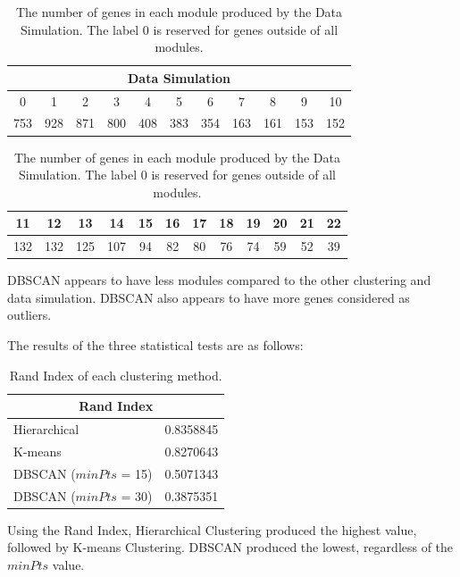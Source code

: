 \documentclass[sigconf,authordraft]{acmart}
\begin{document}
\begin{table}[H]
\begin{center}
\begin{tabular}{|c|c|c|c|c|c|c|c|c|c|c|}
\hline
\multicolumn{11}{|c|}{Data Simulation} \tabularnewline
\hline
0 & 1 & 2 & 3 & 4 & 5 & 6 & 7 & 8 & 9 & 10\\
\hline
753 & 928 & 871 & 800 & 408 & 383 & 354 & 163 & 161 & 153 & 152\\
\hline
\end{tabular}
\end{center}

\begin{center}
\begin{tabular}{|c|c|c|c|c|c|c|c|c|c|c|c|}
\hline
11 & 12 & 13 & 14 & 15 & 16 & 17 & 18 & 19 & 20 & 21 & 22\\
\hline
132 & 132 & 125 & 107 & 94 & 82 & 80 & 76 & 74 & 59 & 52 & 39\\
\hline
\end{tabular}
\end{center}
\caption{The number of genes in each module produced by the Data Simulation. The label 0 is reserved for genes outside of all modules.}
\end{table}

DBSCAN appears to have less modules compared to the other clustering and data simulation. DBSCAN also appears to have more genes considered as outliers.

The results of the three statistical tests are as follows:

\begin{table}[H]
\begin{center}
\begin{tabular}{|l|r|}
\hline
\multicolumn{2}{|c|}{Rand Index} \tabularnewline
\hline
Hierarchical & 0.8358845 \\
\hline
K-means & 0.8270643 \\
\hline
DBSCAN ($minPts$ = 15) & 0.5071343 \\
\hline
DBSCAN ($minPts$ = 30) & 0.3875351 \\
\hline
\end{tabular}
\end{center}
\caption{Rand Index of each clustering method.}
\end{table}

Using the Rand Index, Hierarchical Clustering produced the highest value, followed by K-means Clustering. DBSCAN produced the lowest, regardless of the $minPts$ value.
\end{document}
